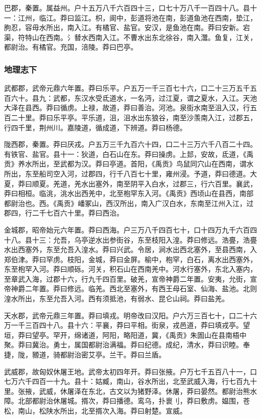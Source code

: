 \documentclass[]{article}
\begin{document}
巴郡，秦置。属益州。户十五万八千六百四十三，口七十万八千一百四十八。县十一：江州，临江。莽曰监江。枳，阆中，彭道将池在南，彭道鱼池在西南，垫江，朐忍，容毋水所出，南入江。有橘官、盐官。安汉，是鱼池在南。莽曰安新。宕渠，符特山在西南。氵朁水西南入江。不曹水出东北徐谷，南入灊。鱼复，江关，都尉治。有橘官。充国，涪陵。莽曰巴亭。

\hypertarget{header-n2591}{%
\subsubsection{地理志下}\label{header-n2591}}

武都郡，武帝元鼎六年置。莽曰乐平。户五万一千三百七十六，口二十三万五千五百六十。县九：武都，东汉水受氐道水，一名沔，过江夏，谓之夏水，入江。天池大泽在县西。莽曰循虏。上禄，故道，莽曰善治。河池。泉街水南至沮入汉，行五百二十里。莽曰乐平亭。平乐道，沮，沮水出东狼谷，南至沙羡南入江，过郡五，行四千里，荆州川。嘉陵道，循成道，下辨道。莽曰杨德。

陇西郡，秦置。莽曰厌戎。户五万三千九百六十四，口二十三万六千八百二十四。有铁官、盐官。县十一：狄道，白石山在东。莽曰操虏。上邽，安故，氐道，《禹贡》养水所出，至武都为汉。莽曰亭道。首阳，《禹贡》鸟鼠同穴山在西南，谓水所出，东至船司空入河，过郡四，行千八百七十里，雍州浸。予道，莽曰德道。大夏，莽曰顺夏。羌道，羌水出塞外，南至阴平入白水，过郡三，行六百里。襄武，莽曰相桓。临洮，洮水出西羌中，北至枹罕东入河。《禹贡》西顷山在县西，南部都尉治也。西。《禹贡》嶓冢山，西汉所出，南入广汉白水，东南至江州入江，过郡四，行二千七百六十里。莽曰西治。

金城郡，昭帝始元六年置。莽曰西海。户三万八千四百七十，口十四万九千六百四十八。县十三：允吾，乌亭逆水出参街谷，东至枝阳入湟。莽曰修远。浩亹，浩亹水出西塞外，东至允吾入湟水。莽曰兴武。令居，涧水出西北塞外，至县西南，入郑伯津。莽曰罕虏。枝阳，金城，莽曰金屏。榆中，枹罕，白石，离水出西塞外，东至枹罕入河。莽曰顺砾。河关，积石山在西南羌中。河水行塞外，东北入塞内，至章武入海，过郡十六，行九千四百里。破羌，宣帝神爵二年置。安夷，允街，宣帝神爵二年置。莽曰修远。临羌。西北至塞外，有西王母石室、仙海、盐池。北则湟水所出，东至允吾入河。西有须抵池，有弱水、昆仑山祠。莽曰盐羌。

天水郡，武帝元鼎三年置。莽曰填戎。明帝改曰汉阳。户六万三百七十，口二十六万一千三百四十八。县十六：平襄，莽曰平相。街泉，戎邑道，莽曰填戎亭。望垣，莽曰望亭。罕开，绵诸道，阿阳，略阳道，冀，《禹贡》朱圄山在县南梧中聚。莽曰冀治。勇士，属国都尉治满福。莽曰纪德。成纪，清水，莽曰识睦。奉捷，陇，豲道，骑都尉治密艾亭。兰干。莽曰兰盾。

武威郡，故匈奴休屠王地。武帝太初四年开。莽曰张掖。户万七千五百八十一，口七万六千四百一十九。县十：姑臧，南山，谷水所出，北至武威入海，行七百九十里。张掖，武威，休屠泽在东北，古文以为猪野泽。休屠，莽曰晏然。都尉治熊水障。北部都尉治休屠城。揟次，莽曰播德。鸾乌，扑褱刂，莽曰敷虏。媪围，苍松，南山，松陕水所出，北至揟次入海。莽曰射楚。宣威。
\end{document}
